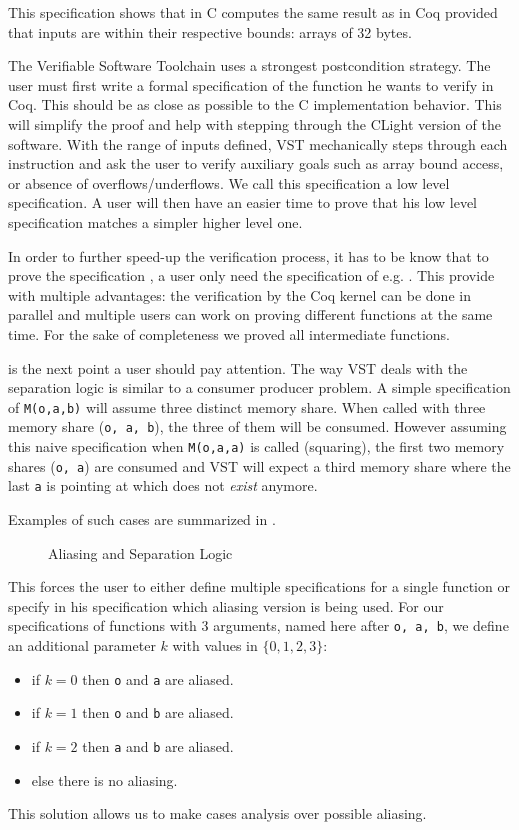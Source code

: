 This specification shows that  in C computes the same
result as  in Coq provided that inputs are within their respective
bounds: arrays of 32 bytes.

The Verifiable Software Toolchain uses a strongest postcondition strategy.
The user must first write a formal specification of the function he wants to verify in Coq.
This should be as close as possible to the C implementation behavior.
This will simplify the proof and help with stepping through the CLight version of the software.
With the range of inputs defined, VST mechanically steps through each instruction
and ask the user to verify auxiliary goals such as array bound access, or absence of overflows/underflows.
We call this specification a low level specification. A user will then have an easier
time to prove that his low level specification matches a simpler higher level one.

In order to further speed-up the verification process, it has to be know that to
prove the specification , a user only need the specification of e.g. .
This provide with multiple advantages: the verification by the Coq kernel can be done
in parallel and multiple users can work on proving different functions at the same time.
For the sake of completeness we proved all intermediate functions.

 is the next point a user should pay attention. The way VST
deals with the separation logic is similar to a consumer producer problem.
A simple specification of \texttt{M(o,a,b)} will assume three distinct memory share.
When called with three memory share (\texttt{o, a, b}), the three of them will be consumed.
However assuming this naive specification when \texttt{M(o,a,a)} is called (squaring),
the first two memory shares (\texttt{o, a}) are consumed and VST will expect a third
memory share where the last \texttt{a} is pointing at which does not \textit{exist} anymore.

Examples of such cases are summarized in .
\begin{figure}[h]
  \centering
  
  \caption{Aliasing and Separation Logic}
  \label{tikz:MemSame}
\end{figure}

This forces the user to either define multiple specifications for a single function
or specify in his specification which aliasing version is being used.
For our specifications of functions with 3 arguments, named here after \texttt{o, a, b},
we define an additional parameter $k$ with values in
$\{0,1,2,3\}$:
\begin{itemize}
  \item if $k=0$ then \texttt{o} and \texttt{a} are aliased.
  \item if $k=1$ then \texttt{o} and \texttt{b} are aliased.
  \item if $k=2$ then \texttt{a} and \texttt{b} are aliased.
  \item else there is no aliasing.
\end{itemize}
This solution allows us to make cases analysis over possible aliasing.

